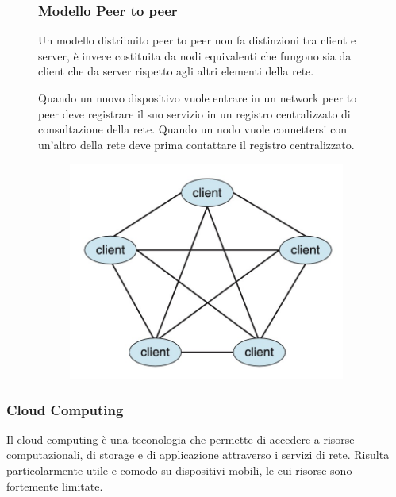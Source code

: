 \begin{figure}[H]
    \begin{minipage}{0.55\textwidth}
        \subsubsection*{Modello Peer to peer}
        Un modello distribuito peer to peer non fa distinzioni tra client e server, è invece costituita da nodi equivalenti che fungono sia da client che da server rispetto agli altri elementi della rete.

        \spacer

        Quando un nuovo dispositivo vuole entrare in un network peer to peer deve registrare il suo servizio in un registro centralizzato di consultazione della rete. Quando un nodo vuole connettersi con un'altro della rete deve prima contattare il registro centralizzato.
    \end{minipage}
    \hfill
    \begin{minipage}{0.35\textwidth}
        \begin{figure}[H]
            \centering
            \includegraphics[width=0.9\linewidth]{assets/peer-to-peer.jpg}
        \end{figure}
    \end{minipage}
\end{figure}

\subsubsection*{Cloud Computing}
Il cloud computing è una teconologia che permette di accedere a risorse computazionali, di storage e di applicazione attraverso i servizi di rete.
Risulta particolarmente utile e comodo su dispositivi mobili, le cui risorse sono fortemente limitate.

